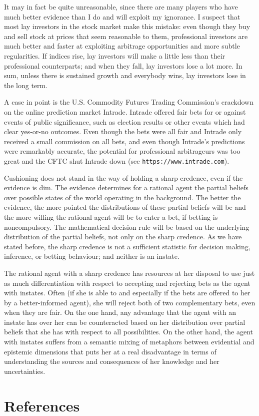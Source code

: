 \documentclass[11pt]{article}
\begin{document}
It may in fact be quite unreasonable, since there are many players who
have much better evidence than I do and will exploit my ignorance. I
suspect that most lay investors in the stock market make this mistake:
even though they buy and sell stock at prices that seem reasonable to
them, professional investors are much better and faster at exploiting
arbitrage opportunities and more subtle regularities. If indices rise,
lay investors will make a little less than their professional
counterparts; and when they fall, lay investors lose a lot more. In
sum, unless there is sustained growth and everybody wins, lay
investors lose in the long term.

A case in point is the U.S. Commodity Futures Trading Commission's
crackdown on the online prediction market Intrade. Intrade offered
fair bets for or against events of public significance, such as
election results or other events which had clear yes-or-no outcomes.
Even though the bets were all fair and Intrade only received a small
commission on all bets, and even though Intrade's predictions were
remarkably accurate, the potential for professional arbitrageurs was
too great and the CFTC shut Intrade down (see
\texttt{https://www.intrade.com}).

Cushioning does not stand in the way of holding a sharp credence, even
if the evidence is dim. The evidence determines for a rational agent
the partial beliefs over possible states of the world operating in the
background. The better the evidence, the more pointed the
distributions of these partial beliefs will be and the more willing
the rational agent will be to enter a bet, if betting is
noncompulsory. The mathematical decision rule will be based on the
underlying distribution of the partial beliefs, not only on the sharp
credence. As we have stated before, the sharp credence is not a
sufficient statistic for decision making, inference, or betting
behaviour; and neither is an instate.

The rational agent with a sharp credence has resources at her disposal
to use just as much differentiation with respect to accepting and
rejecting bets as the agent with instates. Often (if she is able to
and especially if the bets are offered to her by a better-informed
agent), she will reject both of two complementary bets, even when they
are fair. On the one hand, any advantage that the agent with an
instate has over her can be counteracted based on her distribution
over partial beliefs that she has with respect to all possibilities.
On the other hand, the agent with instates suffers from a semantic
mixing of metaphors between evidential and epistemic dimensions that
puts her at a real disadvantage in terms of understanding the sources
and consequences of her knowledge and her uncertainties.

\section{References}
\label{References}

 

\end{document}
